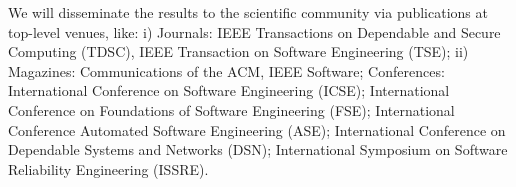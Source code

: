 \documentclass[12pt]{article}
\begin{document}
%
%
%

 We will disseminate the results to the scientific community via publications at top-level venues, like: i) Journals: IEEE Transactions on Dependable and Secure Computing (TDSC), IEEE Transaction on Software Engineering (TSE); 
ii) Magazines: Communications of the ACM, IEEE Software; Conferences: 
International Conference on Software Engineering (ICSE);  International Conference on Foundations of Software Engineering (FSE); International Conference 
Automated Software Engineering (ASE); International Conference on Dependable Systems and Networks (DSN); International Symposium on Software Reliability Engineering (ISSRE).

%

\vspace{-.3cm}



\end{document}
